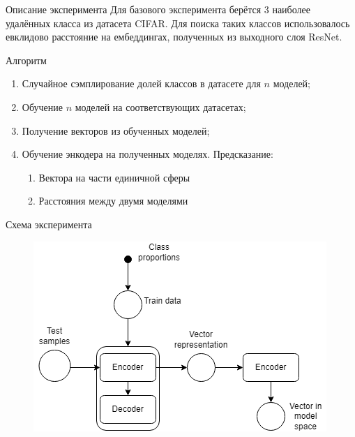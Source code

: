 \documentclass{beamer}
\begin{document}
\begin{frame}{Описание эксперимента}
Для базового эксперимента берётся 3 наиболее удалённых класса из датасета CIFAR. Для поиска таких классов использовалось евклидово расстояние на ембеддингах, полученных из выходного слоя ResNet.

\begin{block}{Алгоритм}
\begin{enumerate}
    \item Случайное сэмплирование долей классов в датасете для $n$ моделей;

    \item Обучение $n$ моделей на соответствующих датасетах;

    \item Получение векторов из обученных моделей;

    \item Обучение энкодера на полученных моделях. Предсказание:
        \begin{enumerate}
            \item Вектора на части единичной сферы

            \item Расстояния между двумя моделями
        \end{enumerate}
\end{enumerate}
\end{block}
\end{frame}
\begin{frame}{Схема эксперимента}
\begin{figure}
    \includegraphics[width=1.0\linewidth]{Pictures/Model.png}
\end{figure}
\end{frame}
\end{document}
